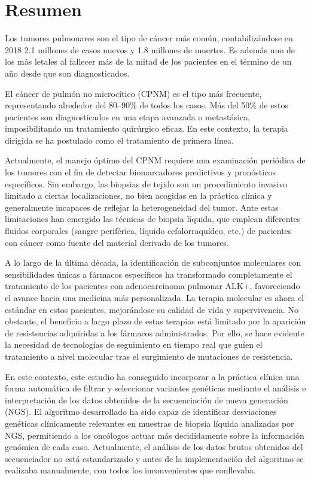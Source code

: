 \chapter*{Resumen}

Los tumores pulmonares son el tipo de cáncer más común, contabilizándose en 2018 2.1 millones de casos nuevos y 1.8 millones de muertes. Es además uno de los más letales al fallecer más de la mitad de los pacientes en el término de un año desde que son diagnosticados.

El cáncer de pulmón no microcítico (CPNM) es el tipo más frecuente, representando alrededor del 80–90\% de todos los casos. Más del 50\% de estos pacientes son diagnosticados en una etapa avanzada o metastásica, imposibilitando un tratamiento quirúrgico eficaz. En este contexto, la terapia dirigida se ha postulado como el tratamiento de primera línea.

Actualmente, el manejo óptimo del CPNM requiere una examinación periódica de los tumores con el fin de detectar biomarcadores predictivos y pronósticos específicos. Sin embargo, las biopsias de tejido son un procedimiento invasivo limitado a ciertas localizaciones, no bien acogidas en la práctica clínica y generalmente incapaces de reflejar la heterogeneidad del tumor. Ante estas limitaciones han emergido las técnicas de biopsia líquida, que emplean diferentes fluidos corporales (sangre periférica, líquido cefalorraquídeo, etc.) de pacientes con cáncer como fuente del material derivado de los tumores.

A lo largo de la última década, la identificación de subconjuntos moleculares con sensibilidades únicas a fármacos específicos ha transformado completamente el tratamiento de los pacientes con adenocarcinoma pulmonar ALK+, favoreciendo el avance hacia una medicina más personalizada. La terapia molecular es ahora el estándar en estos pacientes, mejorándose su calidad de vida y supervivencia. No obstante, el beneficio a largo plazo de estas terapias está limitado por la aparición de resistencias adquiridas a los fármacos administrados. Por ello, se hace evidente la necesidad de tecnologías de seguimiento en tiempo real que guíen el tratamiento a nivel molecular tras el surgimiento de mutaciones de resistencia.

En este contexto, este estudio ha conseguido incorporar a la práctica clínica una forma automática de filtrar y seleccionar variantes genéticas mediante el análisis e interpretación de los datos obtenidos de la secuenciación de nueva generación (NGS). El algoritmo desarrollado ha sido capaz de identificar desviaciones genéticas clínicamente relevantes en muestras de biopsia líquida analizadas por NGS, permitiendo a los oncólogos actuar más decididamente sobre la información genómica de cada caso. Actualmente, el análisis de los datos brutos obtenidos del secuenciador no está estandarizado y antes de la implementación del algoritmo se realizaba manualmente, con todos los inconvenientes que conllevaba.

